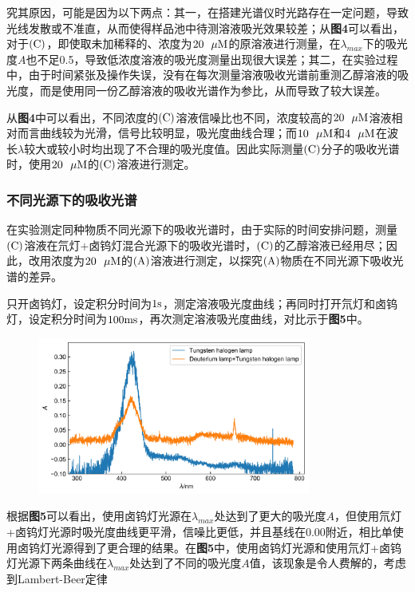 \documentclass[12pt]{article}
\begin{document}
 究其原因，可能是因为以下两点：其一，在搭建光谱仪时光路存在一定问题，导致光线发散或不准直，从而使得样品池中待测溶液吸光效果较差；从\textbf{图4}可以看出，对于${\rm (C)}$，即使取未加稀释的、浓度为$20\ \ \mu {\rm M}$的原溶液进行测量，在$\lambda_{max}$下的吸光度$A$也不足0.5，导致低浓度溶液的吸光度测量出现很大误差；其二，在实验过程中，由于时间紧张及操作失误，没有在每次测量溶液吸收光谱前重测乙醇溶液的吸光度，而是使用同一份乙醇溶液的吸收光谱作为参比，从而导致了较大误差。\par 
 从\textbf{图4}中可以看出，不同浓度的${\rm (C)}$溶液信噪比也不同，浓度较高的$20\ \ \mu{\rm M}$溶液相对而言曲线较为光滑，信号比较明显，吸光度曲线合理；而$10\ \ \mu{\rm M}$和$4\ \ \mu{\rm M}$在波长$\lambda$较大或较小时均出现了不合理的吸光度值。因此实际测量${\rm (C)}$分子的吸收光谱时，使用$20\ \ \mu{\rm M}$的${\rm (C)}$溶液进行测定。
 \subsubsection{不同光源下的吸收光谱}
 在实验测定同种物质不同光源下的吸收光谱时，由于实际的时间安排问题，测量$\rm (C)$溶液在氘灯+卤钨灯混合光源下的吸收光谱时，${\rm (C)}$的乙醇溶液已经用尽；因此，改用浓度为$20\ \ \mu {\rm M}$的${\rm (A)}$溶液进行测定，以探究${\rm (A)}$物质在不同光源下吸收光谱的差异。\par 
 只开卤钨灯，设定积分时间为$1 {\rm s}$，测定溶液吸光度曲线；再同时打开氘灯和卤钨灯，设定积分时间为$100 {\rm ms}$，再次测定溶液吸光度曲线，对比示于\textbf{图5}中。
 \begin{figure}[h]
 	\centering
 	\includegraphics[width=0.8\textwidth]{5.jpg}
\end{figure}
\par 
根据\textbf{图5}可以看出，使用卤钨灯光源在$\lambda_{max}$处达到了更大的吸光度$A$，但使用氘灯+卤钨灯光源时吸光度曲线更平滑，信噪比更低，并且基线在0.00附近，相比单使用卤钨灯光源得到了更合理的结果。在\textbf{图5}中，使用卤钨灯光源和使用氘灯+卤钨灯光源下两条曲线在$\lambda_{max}$处达到了不同的吸光度$A$值，该现象是令人费解的，考虑到Lambert-Beer定律
\end{document}
